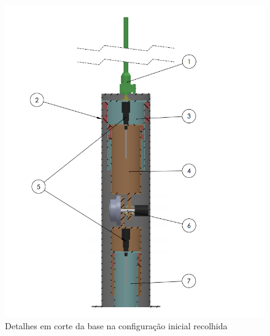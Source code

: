 \begin{figure}[h!]
\centering
	\includegraphics[width=\columnwidth]{figs/estudo/solid/base_recolhida.png} 
	\caption{Detalhes em corte da base na configuração inicial recolhida}
	\label{fig::base_recolhida}
\end{figure}

